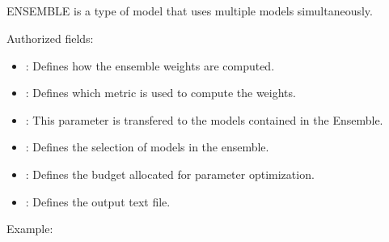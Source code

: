 \documentclass[letterpaper,10pt,english]{sphinxmanual}
\begin{document}
\subsection{}
\label{\detokenize{SgteLib:ensemble}}\label{\detokenize{SgteLib:id10}}
\begin{DUlineblock}{0em}
\item[] ENSEMBLE is a type of model that uses multiple models simultaneously.
\item[] Authorized fields:
\end{DUlineblock}
\begin{itemize}
\item {} 
\sphinxAtStartPar
{\hyperref[\detokenize{SgteLib:weight}]{}}: Defines how the ensemble weights are computed.

\item {} 
\sphinxAtStartPar
{\hyperref[\detokenize{SgteLib:metric}]{}}: Defines which metric is used to compute the weights.

\item {} 
\sphinxAtStartPar
{\hyperref[\detokenize{SgteLib:distance-type}]{}}: This parameter is transfered to the models contained in the Ensemble.

\item {} 
\sphinxAtStartPar
{\hyperref[\detokenize{SgteLib:preset}]{}}: Defines the selection of models in the ensemble.

\item {} 
\sphinxAtStartPar
{\hyperref[\detokenize{SgteLib:budget}]{}}: Defines the budget allocated for parameter optimization.

\item {} 
\sphinxAtStartPar
{\hyperref[\detokenize{SgteLib:output}]{}}: Defines the output text file.

\end{itemize}

\begin{DUlineblock}{0em}
\item[] Example:
\item[] 
\item[] 
\end{DUlineblock}
\end{document}
